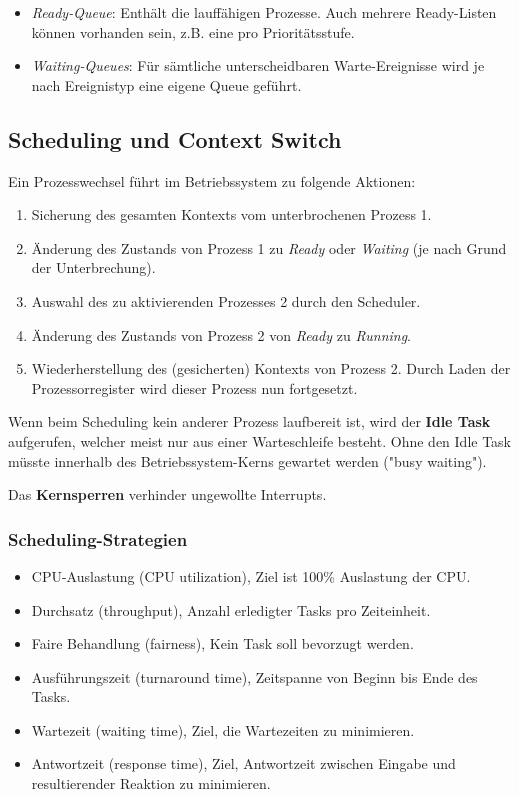 \begin{itemize}
	\itemsep-.5em
	\item \textit{Ready-Queue}: Enthält die lauffähigen Prozesse. Auch mehrere Ready-Listen können vorhanden sein, z.B. eine pro Prioritätsstufe.
	\item \textit{Waiting-Queues}: Für sämtliche unterscheidbaren Warte-Ereignisse wird je nach Ereignistyp eine eigene Queue geführt.
\end{itemize}


\subsection{Scheduling und Context Switch}

Ein Prozesswechsel führt im Betriebssystem zu folgende Aktionen:

\begin{enumerate}
	\itemsep-.5em 
	\item Sicherung des gesamten Kontexts vom unterbrochenen Prozess 1.
	\item Änderung des Zustands von Prozess 1 zu \textit{Ready} oder \textit{Waiting} (je nach Grund der Unterbrechung).
	\item Auswahl des zu aktivierenden Prozesses 2 durch den Scheduler.
	\item Änderung des Zustands von Prozess 2 von \textit{Ready} zu \textit{Running}.
	\item Wiederherstellung des (gesicherten) Kontexts von Prozess 2. Durch Laden der Prozessorregister wird dieser Prozess nun fortgesetzt.
\end{enumerate}

Wenn beim Scheduling kein anderer Prozess laufbereit ist, wird der \textbf{Idle Task} aufgerufen, welcher meist nur aus einer Warteschleife besteht.
Ohne den Idle Task müsste innerhalb des Betriebssystem-Kerns gewartet werden ("busy waiting").

Das \textbf{Kernsperren} verhinder ungewollte Interrupts.

\subsubsection{Scheduling-Strategien}

\begin{itemize}
	\itemsep-.5em 
	\item CPU-Auslastung (CPU utilization), Ziel ist 100\% Auslastung der CPU.
	\item Durchsatz (throughput), Anzahl erledigter Tasks pro Zeiteinheit.
	\item Faire Behandlung (fairness), Kein Task soll bevorzugt werden.
	\item Ausführungszeit (turnaround time), Zeitspanne von Beginn bis Ende des Tasks.
	\item Wartezeit (waiting time), Ziel, die Wartezeiten zu minimieren.
	\item Antwortzeit (response time), Ziel, Antwortzeit zwischen Eingabe und resultierender Reaktion zu minimieren.
\end{itemize}

